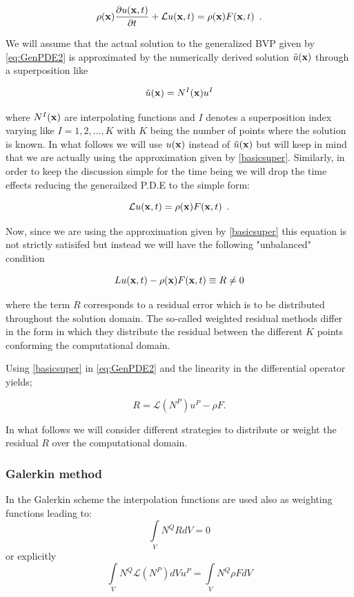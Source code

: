 \begin{equation}
\rho(\vb x) \pdv{u(\vb x, t)}{t} + \mathcal{L}u(\vb x, t) = \rho (\vb x)F(\vb x, t) \enspace .
\label{eq:GenPDE2}
\end{equation}


We will assume that the actual solution to the generalized BVP given by \cref{eq:GenPDE2} is approximated by the numerically derived solution $\tilde u(\vb{x})$ through a superposition like

\begin{equation}
\tilde u (\vb{x}) = {N^I}(\vb{x}){u^I}
\label{basicsuper}
\end{equation}

where ${N^I}(\vb{x})$ are interpolating functions and $I$ denotes a superposition index  varying like $I=1,2,...,K$ with $K$ being the number of points where the solution is known. In what follows we will use $u(\vb{x})$ instead of $\tilde u (\vb{x})$ but will keep in mind that we are actually using the approximation given by \cref{basicsuper}. Similarly, in order to keep the discussion simple for the time being we will drop the time effects reducing the generailzed P.D.E to the simple form:

\begin{equation}
\mathcal{L}u(\vb x, t) = \rho (\vb x)F(\vb x, t) \enspace .
\label{eq:GenPDE3}
\end{equation}



Now, since we are using the approximation given by \cref{basicsuper} this equation is not strictly satisifed but instead we will have the following "unbalanced" condition

\[Lu(\vb{x},t) - \rho (\vb{x})F(\vb{x}, t) \equiv R \ne 0\]

where the term $R$ corresponds to a residual error which is to be distributed throughout the solution domain. The so-called weighted residual methods differ in the form in which they distribute the residual between the different $K$ points conforming the computational domain.

Using \cref{basicsuper} in \cref{eq:GenPDE2} and the linearity in the differential operator yields;

\[R = \mathcal{L}({N^P}){u^P} - \rho F.\]

In what follows we will consider different strategies to distribute or weight the residual $R$ over the computational domain.

\subsubsection{Galerkin method}
In the Galerkin scheme the interpolation functions are used also as weighting functions leading to:
\[\int\limits_V {{N^Q}RdV = 0} \]
or explicitly
\begin{equation}
\int\limits_V {{N^Q} \mathcal{L} ({N^P})dV} {u^P} = \int\limits_V {{N^Q}\rho FdV}
\label{eq:Galer}
\end{equation}


